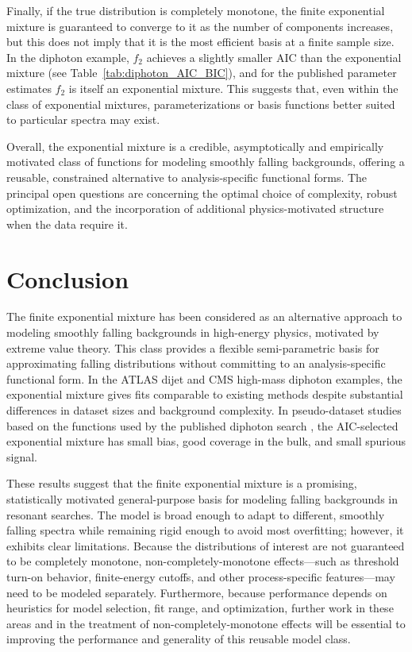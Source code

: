 \documentclass[a4paper,11pt]{article}
\begin{document}
Finally, if the true distribution is completely monotone, the finite exponential mixture is guaranteed 
to converge to it as the number of components increases, but this does not imply that it is the most 
efficient basis at a finite sample size.
In the diphoton example, $f_2$ achieves a slightly smaller AIC than the exponential mixture 
(see Table~\ref{tab:diphoton_AIC_BIC}), and for the published parameter estimates $f_2$ is 
itself an exponential mixture.
This suggests that, even within the class of exponential mixtures, parameterizations or basis functions better suited to particular spectra may exist.

Overall, the exponential mixture is a credible, asymptotically and empirically motivated class of functions for modeling smoothly falling backgrounds, offering a reusable, constrained alternative to 
analysis-specific functional forms.
The principal open questions are concerning the optimal choice of complexity, robust optimization, and the incorporation of additional physics-motivated structure when the data require it.

\section{Conclusion} \label{sec:conclusion}

The finite exponential mixture has been considered as an alternative approach to modeling 
smoothly falling backgrounds in high-energy physics, motivated by extreme value theory.
This class provides a flexible semi-parametric basis for approximating falling distributions 
without committing to an analysis-specific functional form. In the ATLAS dijet and CMS 
high-mass diphoton examples, the exponential mixture gives fits comparable to existing methods despite substantial differences in dataset sizes and background complexity.
In pseudo-dataset studies based on the functions used by the published diphoton search \cite{CMS_high_mass_diphoton}, the AIC-selected exponential mixture has small bias, good coverage in the bulk, and small spurious signal.

These results suggest that the finite exponential mixture is a promising, statistically motivated general-purpose basis for modeling falling backgrounds in resonant searches. The model is broad enough to adapt to different, smoothly falling spectra while remaining rigid enough to avoid most overfitting; however, it exhibits clear limitations. Because the distributions of interest are not guaranteed to be completely monotone, non-completely-monotone effects—such as threshold turn-on behavior, finite-energy cutoffs, and other process-specific features—may need to be modeled separately. Furthermore, because performance depends on heuristics for model selection, fit range, and optimization, further work in these areas and in the treatment of non-completely-monotone effects will be essential to improving the performance and generality of this reusable model class.
\end{document}
